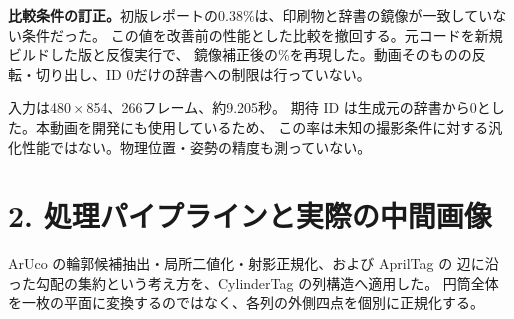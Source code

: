\documentclass[a4paper,10pt]{ltjsarticle}
\newcommand{\smallnote}[1]{{\small\color{muted}#1}}
\begin{document}
\textbf{比較条件の訂正。}初版レポートの0.38\%は、印刷物と辞書の鏡像が一致していない条件だった。
この値を改善前の性能とした比較を撤回する。元コードを新規ビルドした版と反復実行で、
鏡像補正後の\BeforeRate\%を再現した。動画そのものの反転・切り出し、ID 0だけの辞書への制限は行っていない。

\smallnote{入力は480\,$\times$\,854、266フレーム、約9.205秒。
期待 ID は生成元の辞書から0とした。本動画を開発にも使用しているため、
この率は未知の撮影条件に対する汎化性能ではない。物理位置・姿勢の精度も測っていない。}

\clearpage
\section*{2. 処理パイプラインと実際の中間画像}
ArUco の輪郭候補抽出・局所二値化・射影正規化、および AprilTag の
辺に沿った勾配の集約という考え方を、CylinderTag の列構造へ適用した\cite{aruco,apriltag2,apriltagcode}。
円筒全体を一枚の平面に変換するのではなく、各列の外側四点を個別に正規化する。

\begin{figure}[H]\centering
{}
\end{figure}
\end{document}
